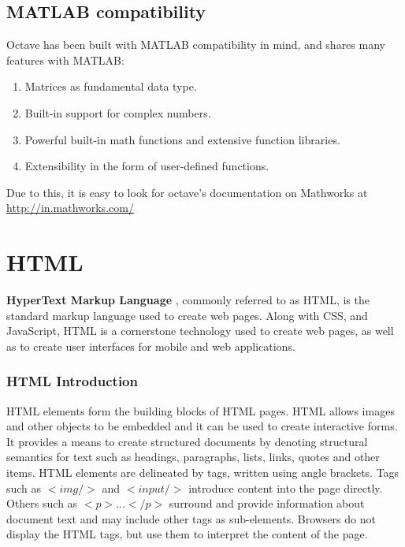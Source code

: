 \documentclass{beamer}
\begin{document}
    \begin{frame}
  \subsection{MATLAB compatibility}
Octave has been built with MATLAB compatibility in mind, and shares many features with MATLAB:
            \begin{enumerate}
                    \item
                        Matrices as fundamental data type.
                    \item
                        Built-in support for complex numbers.
                    \item
                        Powerful built-in math functions and extensive function libraries.
                    \item
                        Extensibility in the form of user-defined functions.
            \end{enumerate}
            Due to this, it is easy to look for octave's documentation on Mathworks at \url{http://in.mathworks.com/}
\end{frame}
\section{HTML}
\begin{frame}

\textbf{ HyperText Markup Language }, commonly referred to as HTML,
is the standard markup
language used to create web pages. Along with CSS, and JavaScript, HTML is a
cornerstone technology used to create web pages, as well as to create user
interfaces for mobile and web applications.\\
\end{frame}

\begin{frame}\frametitle{HTML Introduction}

HTML elements form the building blocks of HTML pages. HTML allows images and other
objects to be embedded and it can be used to create interactive forms. It provides
a means to create structured documents by denoting structural semantics for text
such as headings, paragraphs, lists, links, quotes and other items. HTML elements
are delineated by tags, written using angle brackets. Tags such as $<img/>$ and
$<input />$ introduce content into the page directly. Others such as $<p>$...$</p>$
surround and provide information about document text and may include other tags
as sub-elements. Browsers do not display the HTML tags, but use them to interpret
the content of the page.
\end{frame}
\end{document}
